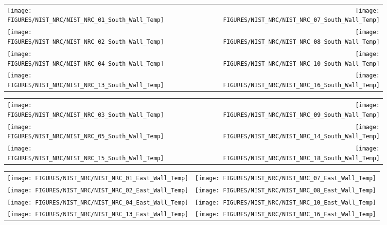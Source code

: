 \begin{figure}[p]
\begin{tabular*}{\textwidth}{l@{\extracolsep{\fill}}r}
\texttt{[image: FIGURES/NIST\_NRC/NIST\_NRC\_01\_South\_Wall\_Temp]} &
\texttt{[image: FIGURES/NIST\_NRC/NIST\_NRC\_07\_South\_Wall\_Temp]} \\
\texttt{[image: FIGURES/NIST\_NRC/NIST\_NRC\_02\_South\_Wall\_Temp]} &
\texttt{[image: FIGURES/NIST\_NRC/NIST\_NRC\_08\_South\_Wall\_Temp]} \\
\texttt{[image: FIGURES/NIST\_NRC/NIST\_NRC\_04\_South\_Wall\_Temp]} &
\texttt{[image: FIGURES/NIST\_NRC/NIST\_NRC\_10\_South\_Wall\_Temp]} \\
\texttt{[image: FIGURES/NIST\_NRC/NIST\_NRC\_13\_South\_Wall\_Temp]} &
\texttt{[image: FIGURES/NIST\_NRC/NIST\_NRC\_16\_South\_Wall\_Temp]}
\end{tabular*}
\label{NIST_NRC_South_Wall_Temp_Closed}
\end{figure}

\begin{figure}[p]
\begin{tabular*}{\textwidth}{l@{\extracolsep{\fill}}r}
\texttt{[image: FIGURES/NIST\_NRC/NIST\_NRC\_03\_South\_Wall\_Temp]} &
\texttt{[image: FIGURES/NIST\_NRC/NIST\_NRC\_09\_South\_Wall\_Temp]} \\
\texttt{[image: FIGURES/NIST\_NRC/NIST\_NRC\_05\_South\_Wall\_Temp]} &
\texttt{[image: FIGURES/NIST\_NRC/NIST\_NRC\_14\_South\_Wall\_Temp]} \\
\texttt{[image: FIGURES/NIST\_NRC/NIST\_NRC\_15\_South\_Wall\_Temp]} &
\texttt{[image: FIGURES/NIST\_NRC/NIST\_NRC\_18\_South\_Wall\_Temp]}
\end{tabular*}
\label{NIST_NRC_South_Wall_Temp_Open}
\end{figure}

\begin{figure}[p]
\begin{tabular*}{\textwidth}{l@{\extracolsep{\fill}}r}
\texttt{[image: FIGURES/NIST\_NRC/NIST\_NRC\_01\_East\_Wall\_Temp]} &
\texttt{[image: FIGURES/NIST\_NRC/NIST\_NRC\_07\_East\_Wall\_Temp]} \\
\texttt{[image: FIGURES/NIST\_NRC/NIST\_NRC\_02\_East\_Wall\_Temp]} &
\texttt{[image: FIGURES/NIST\_NRC/NIST\_NRC\_08\_East\_Wall\_Temp]} \\
\texttt{[image: FIGURES/NIST\_NRC/NIST\_NRC\_04\_East\_Wall\_Temp]} &
\texttt{[image: FIGURES/NIST\_NRC/NIST\_NRC\_10\_East\_Wall\_Temp]} \\
\texttt{[image: FIGURES/NIST\_NRC/NIST\_NRC\_13\_East\_Wall\_Temp]} &
\texttt{[image: FIGURES/NIST\_NRC/NIST\_NRC\_16\_East\_Wall\_Temp]}
\end{tabular*}
\label{NIST_NRC_East_Wall_Temp_Closed}
\end{figure}

